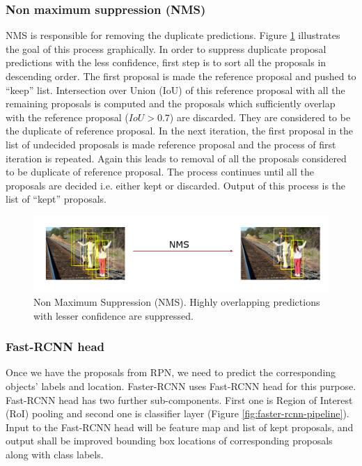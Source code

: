 \subsubsection{Non maximum suppression (NMS)}
NMS is responsible for removing the duplicate predictions. Figure \ref{fig:nms} illustrates the goal of this process graphically. In order to suppress duplicate proposal predictions with the less confidence, first step is to sort all the proposals in descending order. The first proposal is made  the reference proposal and pushed to ``keep'' list. Intersection over Union (IoU) of this reference proposal with all the remaining proposals is computed and the proposals which sufficiently overlap with the reference proposal ($IoU > 0.7$) are discarded. They are considered to be the duplicate of reference proposal. In the next iteration, the first proposal in the list of undecided proposals is made reference proposal and the process of first iteration is repeated. Again this leads to removal of all the proposals considered to be duplicate of reference proposal. The process continues until all the proposals are decided i.e. either kept or discarded. Output of this process is the list of ``kept'' proposals. 

\begin{figure}
    \centering
    \includegraphics[width=\linewidth]{images/nms.PNG}
    \caption[Non Maximum Suppression (NMS)]{Non Maximum Suppression (NMS). Highly overlapping predictions with lesser confidence are suppressed.}
    \label{fig:nms}
\end{figure}

\subsubsection{Fast-RCNN head}
Once we have the proposals from RPN, we need to predict the corresponding objects' labels and location. Faster-RCNN uses Fast-RCNN head\cite{ref_fastrcnn} for this purpose. Fast-RCNN head has two further sub-components. First one is Region of Interest (RoI) pooling and second one is classifier layer (Figure \ref{fig:faster-rcnn-pipeline}). Input to the Fast-RCNN head will be feature map and list of kept proposals, and output shall be improved bounding box locations of corresponding proposals along with class labels. 

